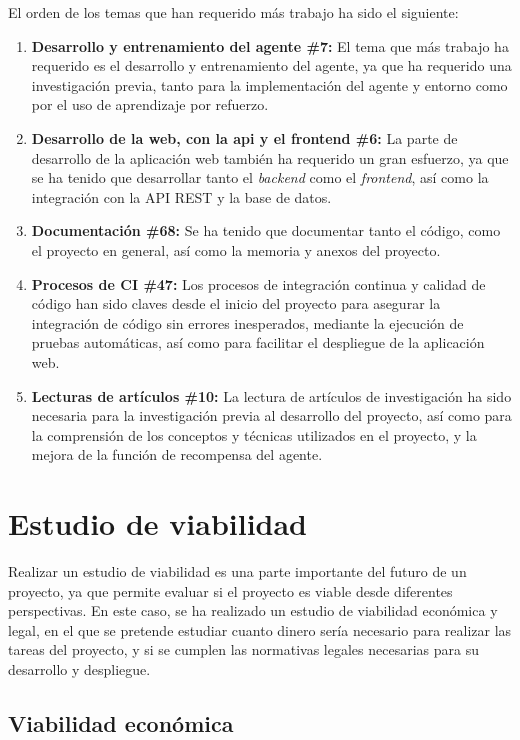 
El orden de los temas que han requerido más trabajo ha sido el siguiente:
\begin{enumerate}
    \item \textbf{Desarrollo y entrenamiento del agente \#7:} El tema que más trabajo ha requerido es el desarrollo y entrenamiento del agente, ya que ha requerido una investigación previa, tanto para la implementación del agente y entorno como por el uso de aprendizaje por refuerzo.
    \item \textbf{Desarrollo de la web, con la api y el frontend \#6:} La parte de desarrollo de la aplicación web también ha requerido un gran esfuerzo, ya que se ha tenido que desarrollar tanto el \textit{backend} como el \textit{frontend}, así como la integración con la API REST y la base de datos.
    \item \textbf{Documentación \#68:}  Se ha tenido que documentar tanto el código, como el proyecto en general, así como la memoria y anexos del proyecto.
    \item \textbf{Procesos de CI \#47:} Los procesos de integración continua y calidad de código han sido claves desde el inicio del proyecto para asegurar la integración de código sin errores inesperados, mediante la ejecución de pruebas automáticas, así como para facilitar el despliegue de la aplicación web.
    
    \item \textbf{Lecturas de artículos \#10:} La lectura de artículos de investigación ha sido necesaria para la investigación previa al desarrollo del proyecto, así como para la comprensión de los conceptos y técnicas utilizados en el proyecto, y la mejora de la función de recompensa del agente.
\end{enumerate}

\section{Estudio de viabilidad}
Realizar un estudio de viabilidad es una parte importante del futuro de un proyecto, ya que permite evaluar si el proyecto es viable desde diferentes perspectivas. En este caso, se ha realizado un estudio de viabilidad económica y legal, en el que se pretende estudiar cuanto dinero sería necesario para realizar las tareas del proyecto, y si se cumplen las normativas legales necesarias para su desarrollo y despliegue.

\subsection{Viabilidad económica}

